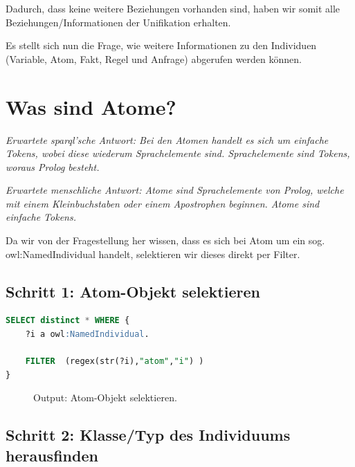 Dadurch, dass keine weitere Beziehungen vorhanden sind, haben wir somit alle Beziehungen/Informationen der Unifikation erhalten.

Es stellt sich nun die Frage, wie weitere Informationen zu den Individuen (Variable, Atom, Fakt, Regel und Anfrage) abgerufen werden können.

\section{Was sind Atome?}
\label{sec:anh_beispiel_d}

\textit{Erwartete sparql’sche Antwort: Bei den Atomen handelt es sich um einfache Tokens, wobei diese wiederum Sprachelemente sind. Sprachelemente sind Tokens, woraus Prolog besteht.}

\textit{Erwartete menschliche Antwort: Atome sind Sprachelemente von Prolog, welche mit einem Kleinbuchstaben oder einem Apostrophen beginnen. Atome sind einfache Tokens.
}

Da wir von der Fragestellung her wissen, dass es sich bei Atom um ein sog. owl:NamedIndividual handelt, selektieren wir dieses direkt per Filter.

\subsection{Schritt 1: Atom-Objekt selektieren}
\label{ssec:anh_beispiel_d_1}

\begin{lstlisting}[caption={Atom-Objekt selektieren},captionpos=b,language=SQL]
SELECT distinct * WHERE { 
	?i a owl:NamedIndividual.
	
	FILTER  (regex(str(?i),"atom","i") )
}
\end{lstlisting}

\begin{figure}[H]
\centering {}
\caption{Output: Atom-Objekt selektieren.\label{fig:atom_1}\protect\footnotemark}
\end{figure}


\newpage
\subsection{Schritt 2: Klasse/Typ des Individuums herausfinden}
\label{ssec:anh_beispiel_f_2}

